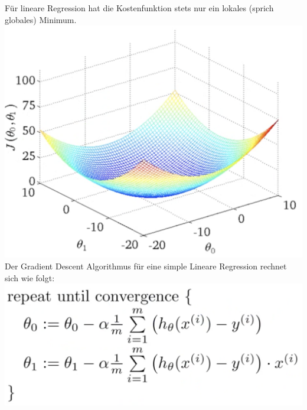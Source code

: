 \begin{flushleft}
Für lineare Regression hat die Kostenfunktion stets nur ein lokales (sprich globales) Minimum.
\linebreak
\includegraphics[scale=0.6]{figures/cost_function_linear_regression}
\linebreak
Der Gradient Descent Algorithmus für eine simple Lineare Regression rechnet sich wie folgt:
\linebreak
\includegraphics[scale=0.4]{figures/gr_algorithm_linear_regression}
\end{flushleft}



